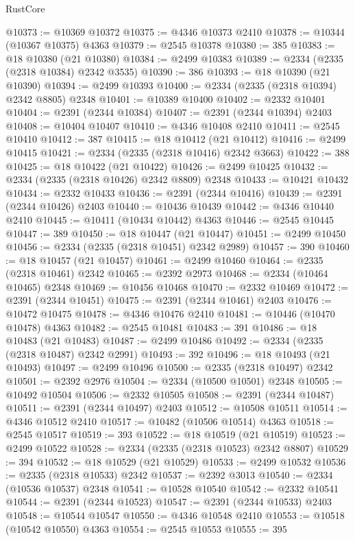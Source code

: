 \begin{lexlean}{RustCore}
\begin{coremodule}
@10373 := @10369 @10372
@10375 := @4346 @10373 @2410
@10378 := @10344 (@10367 @10375) @4363
@10379 := @2545 @10378
@10380 := 385
@10383 := @18 @10380 (@21 @10380)
@10384 := @2499 @10383
@10389 := @2334 (@2335 (@2318 @10384) @2342 @3535)
@10390 := 386
@10393 := @18 @10390 (@21 @10390)
@10394 := @2499 @10393
@10400 := @2334 (@2335 (@2318 @10394) @2342 @8805) @2348
@10401 := @10389 @10400
@10402 := @2332 @10401
@10404 := @2391 (@2344 @10384)
@10407 := @2391 (@2344 @10394) @2403
@10408 := @10404 @10407
@10410 := @4346 @10408 @2410
@10411 := @2545 @10410
@10412 := 387
@10415 := @18 @10412 (@21 @10412)
@10416 := @2499 @10415
@10421 := @2334 (@2335 (@2318 @10416) @2342 @3663)
@10422 := 388
@10425 := @18 @10422 (@21 @10422)
@10426 := @2499 @10425
@10432 := @2334 (@2335 (@2318 @10426) @2342 @8809) @2348
@10433 := @10421 @10432
@10434 := @2332 @10433
@10436 := @2391 (@2344 @10416)
@10439 := @2391 (@2344 @10426) @2403
@10440 := @10436 @10439
@10442 := @4346 @10440 @2410
@10445 := @10411 (@10434 @10442) @4363
@10446 := @2545 @10445
@10447 := 389
@10450 := @18 @10447 (@21 @10447)
@10451 := @2499 @10450
@10456 := @2334 (@2335 (@2318 @10451) @2342 @2989)
@10457 := 390
@10460 := @18 @10457 (@21 @10457)
@10461 := @2499 @10460
@10464 := @2335 (@2318 @10461) @2342
@10465 := @2392 @2973
@10468 := @2334 (@10464 @10465) @2348
@10469 := @10456 @10468
@10470 := @2332 @10469
@10472 := @2391 (@2344 @10451)
@10475 := @2391 (@2344 @10461) @2403
@10476 := @10472 @10475
@10478 := @4346 @10476 @2410
@10481 := @10446 (@10470 @10478) @4363
@10482 := @2545 @10481
@10483 := 391
@10486 := @18 @10483 (@21 @10483)
@10487 := @2499 @10486
@10492 := @2334 (@2335 (@2318 @10487) @2342 @2991)
@10493 := 392
@10496 := @18 @10493 (@21 @10493)
@10497 := @2499 @10496
@10500 := @2335 (@2318 @10497) @2342
@10501 := @2392 @2976
@10504 := @2334 (@10500 @10501) @2348
@10505 := @10492 @10504
@10506 := @2332 @10505
@10508 := @2391 (@2344 @10487)
@10511 := @2391 (@2344 @10497) @2403
@10512 := @10508 @10511
@10514 := @4346 @10512 @2410
@10517 := @10482 (@10506 @10514) @4363
@10518 := @2545 @10517
@10519 := 393
@10522 := @18 @10519 (@21 @10519)
@10523 := @2499 @10522
@10528 := @2334 (@2335 (@2318 @10523) @2342 @8807)
@10529 := 394
@10532 := @18 @10529 (@21 @10529)
@10533 := @2499 @10532
@10536 := @2335 (@2318 @10533) @2342
@10537 := @2392 @3013
@10540 := @2334 (@10536 @10537) @2348
@10541 := @10528 @10540
@10542 := @2332 @10541
@10544 := @2391 (@2344 @10523)
@10547 := @2391 (@2344 @10533) @2403
@10548 := @10544 @10547
@10550 := @4346 @10548 @2410
@10553 := @10518 (@10542 @10550) @4363
@10554 := @2545 @10553
@10555 := 395

\end{coremodule}
\end{lexlean}
